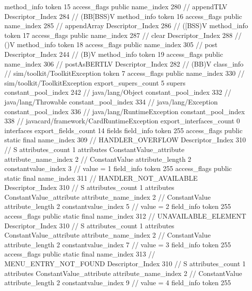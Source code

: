 {{{{{				}
				method_info {
					token	15
					access_flags	public
					name_index	280		// appendTLV
					Descriptor_Index	284		// (BB[BSS)V
				}
				method_info {
					token	16
					access_flags	public
					name_index	285		// appendArray
					Descriptor_Index	286		// ([BSS)V
				}
				method_info {
					token	17
					access_flags	public
					name_index	287		// clear
					Descriptor_Index	288		// ()V
				}
				method_info {
					token	18
					access_flags	public
					name_index	305		// post
					Descriptor_Index	244		// (B)V
				}
				method_info {
					token	19
					access_flags	public
					name_index	306		// postAsBERTLV
					Descriptor_Index	282		// (BB)V
				}
			}
		}
		class_info {		// sim/toolkit/ToolkitException
			token	7
			access_flags	public
			name_index	330		// sim/toolkit/ToolkitException
			export_supers_count	5
			supers {
				constant_pool_index	242		// java/lang/Object
				constant_pool_index	332		// java/lang/Throwable
				constant_pool_index	334		// java/lang/Exception
				constant_pool_index	336		// java/lang/RuntimeException
				constant_pool_index	338		// javacard/framework/CardRuntimeException
			}
			export_interfaces_count	0
			interfaces {
			}
			export_fields_count	14
			fields {
			field_info {
				token	255
				access_flags	public static final
				name_index	309		// HANDLER_OVERFLOW
				Descriptor_Index	310		// S
				attributes_count	1
				attributes {
				ConstantValue_attribute {
					attribute_name_index	2		// ConstantValue
					attribute_length	2
					constantvalue_index	3		// value = 1
				}
				}
			}
			field_info {
				token	255
				access_flags	public static final
				name_index	311		// HANDLER_NOT_AVAILABLE
				Descriptor_Index	310		// S
				attributes_count	1
				attributes {
				ConstantValue_attribute {
					attribute_name_index	2		// ConstantValue
					attribute_length	2
					constantvalue_index	5		// value = 2
				}
				}
			}
			field_info {
				token	255
				access_flags	public static final
				name_index	312		// UNAVAILABLE_ELEMENT
				Descriptor_Index	310		// S
				attributes_count	1
				attributes {
				ConstantValue_attribute {
					attribute_name_index	2		// ConstantValue
					attribute_length	2
					constantvalue_index	7		// value = 3
				}
				}
			}
			field_info {
				token	255
				access_flags	public static final
				name_index	313		// MENU_ENTRY_NOT_FOUND
				Descriptor_Index	310		// S
				attributes_count	1
				attributes {
				ConstantValue_attribute {
					attribute_name_index	2		// ConstantValue
					attribute_length	2
					constantvalue_index	9		// value = 4
				}
				}
			}
			field_info {
				token	255
}}}}}
